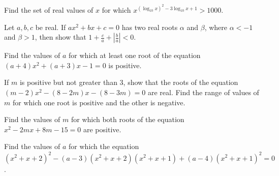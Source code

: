 \item Find the set of real values of $x$ for which $x^{(\log_{10}x)^2 - 3\log_{10}x + 1} > 1000$.
\item Let $a, b, c$ be real. If $ax^2 + bx + c = 0$ has two real roots $\alpha$ and $\beta$, where $\alpha <
  -1$ and $\beta > 1$, then show that $1 + \frac{c}{a} + \left|\frac{b}{a}\right| < 0$.
\item Find the values of $a$ for which at least one root of the equation $(a + 4)x^2 + (a + 3)x - 1 = 0$ is
  positive.
\item If $m$ is positive but not greater than $3$, show that the roots of the equation $(m - 2)x^2 - (8 -
  2m)x - (8 - 3m) = 0$ are real. Find the range of values of $m$ for which one root is positive and the
  other is negative.
\item Find the values of $m$ for which both roots of the equation $x^2 - 2mx + 8m - 15 = 0$ are positive.
\item Find the values of $a$ for which the equation $\left(x^2 + x + 2\right)^2 - (a - 3)\left(x^2 + x +
  2\right)\left(x^2 + x + 1\right) + (a - 4)\left(x^2 + x + 1\right)^2 = 0$.
\stopitemize
